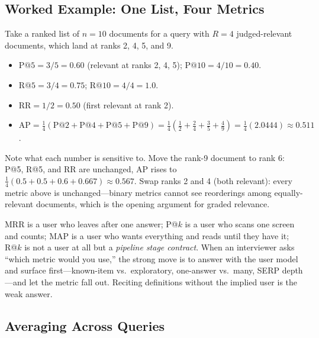 \subsection{Worked Example: One List, Four Metrics}

Take a ranked list of $n = 10$ documents for a query with $R = 4$ judged-relevant documents, which land at ranks 2, 4, 5, and 9.

\begin{itemize}
    \item $\mathrm{P@}5 = 3/5 = 0.60$ (relevant at ranks 2, 4, 5); $\mathrm{P@}10 = 4/10 = 0.40$.
    \item $\mathrm{R@}5 = 3/4 = 0.75$; $\mathrm{R@}10 = 4/4 = 1.0$.
    \item $\mathrm{RR} = 1/2 = 0.50$ (first relevant at rank 2).
    \item $\mathrm{AP} = \frac{1}{4}\left(\mathrm{P@}2 + \mathrm{P@}4 + \mathrm{P@}5 + \mathrm{P@}9\right) = \frac{1}{4}\left(\tfrac{1}{2} + \tfrac{2}{4} + \tfrac{3}{5} + \tfrac{4}{9}\right) = \frac{1}{4}(2.0444) \approx 0.511$.
\end{itemize}

Note what each number is sensitive to. Move the rank-9 document to rank 6: P@5, R@5, and RR are unchanged, AP rises to $\frac{1}{4}(0.5 + 0.5 + 0.6 + 0.667) \approx 0.567$. Swap ranks 2 and 4 (both relevant): every metric above is unchanged---binary metrics cannot see reorderings among equally-relevant documents, which is the opening argument for graded relevance.

\begin{keyinsight}
MRR is a user who leaves after one answer; P@$k$ is a user who scans one screen and counts; MAP is a user who wants everything and reads until they have it; R@$k$ is not a user at all but a \textit{pipeline stage contract}. When an interviewer asks ``which metric would you use,'' the strong move is to answer with the user model and surface first---known-item vs.\ exploratory, one-answer vs.\ many, SERP depth---and let the metric fall out. Reciting definitions without the implied user is the weak answer.
\end{keyinsight}

\subsection{Averaging Across Queries}

